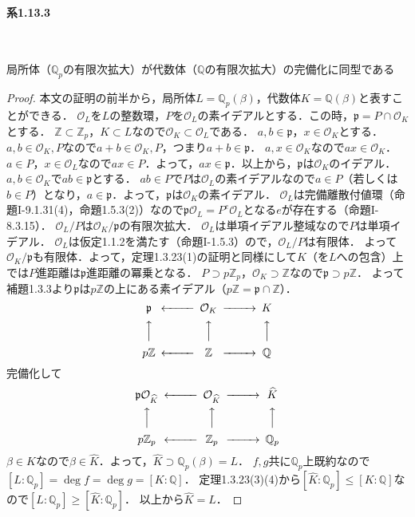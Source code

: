 \paragraph{系1.13.3}~
\begin{screen}
  局所体（$\mathbb{Q}_p$の有限次拡大）が代数体（$\mathbb{Q}$の有限次拡大）の完備化に同型である
\end{screen}
\begin{proof}
  本文の証明の前半から，局所体$L=\mathbb{Q}_p(\beta)$，代数体$K=\mathbb{Q}(\beta)$と表すことができる．
  $\mathcal{O}_L$を$L$の整数環，$P$を$\mathcal{O}_L$の素イデアルとする．この時，$\mathfrak{p}=P\cap\mathcal{O}_K$とする．
  $\mathbb{Z} \subset \mathbb{Z}_p$，$K \subset L$なので$\mathcal{O}_K \subset \mathcal{O}_L$である．
  $a,b\in\mathfrak{p}$，$x\in\mathcal{O}_K$とする．
  $a,b\in\mathcal{O}_K,P$なので$a+b\in\mathcal{O}_K,P$，つまり$a+b\in\mathfrak{p}$．
  $a,x\in\mathcal{O}_K$なので$ax\in\mathcal{O}_K$．
  $a\in P$，$x\in\mathcal{O}_L$なので$ax\in P$．よって，$ax\in\mathfrak{p}$．以上から，$\mathfrak{p}$は$\mathcal{O}_K$のイデアル．
  $a,b\in\mathcal{O}_K$で$ab\in \mathfrak{p}$とする．
  $ab\in P$で$P$は$\mathcal{O}_L$の素イデアルなので$a\in P$（若しくは$b\in P$）となり，$a\in\mathfrak{p}$．よって，$\mathfrak{p}$は$\mathcal{O}_K$の素イデアル．
  $\mathcal{O}_L$は完備離散付値環（命題I-9.1.31(4)，命題1.5.3(2)）なので$\mathfrak{p}\mathcal{O}_L=P^e\mathcal{O}_L$となる$e$が存在する（命題I-8.3.15）．
  $\mathcal{O}_L/P$は$\mathcal{O}_K/\mathfrak{p}$の有限次拡大．
  $\mathcal{O}_L$は単項イデアル整域なので$P$は単項イデアル．
  $\mathcal{O}_L$は仮定1.1.2を満たす（命題I-1.5.3）ので，$\mathcal{O}_L/P$は有限体．
  よって$\mathcal{O}_K/\mathfrak{p}$も有限体．よって，定理1.3.23(1)の証明と同様にして$K$（を$L$への包含）上では$P$進距離は$\mathfrak{p}$進距離の冪乗となる．
  $P\supset p\mathbb{Z}_p$，$\mathcal{O}_K\supset\mathbb{Z}$なので$\mathfrak{p}\supset p\mathbb{Z}$．
  よって補題1.3.3より$\mathfrak{p}$は$p\mathbb{Z}$の上にある素イデアル（$p\mathbb{Z}=\mathfrak{p}\cap\mathbb{Z}$）．
  \[
  \begin{CD}
    \mathfrak{p} @<<< \mathcal{O}_K @>>> K \\
    @AAA         @AAA               @AAA \\
    p\mathbb{Z}  @<<< \mathbb{Z}    @>>> \mathbb{Q}
  \end{CD}
  \]
  完備化して
  \[
  \begin{CD}
    \mathfrak{p}\mathcal{O}_{\widehat{K}}   @<<< \mathcal{O}_{\widehat{K}} @>>> \widehat{K}\\
    @AAA                              @AAA                     @AAA \\
    p\mathbb{Z}_p                     @<<< \mathbb{Z}_p        @>>> \mathbb{Q}_p
  \end{CD}
  \]
  $\beta\in K$なので$\beta\in\widehat{K}$．よって，$\widehat{K}\supset\mathbb{Q}_p(\beta)=L$．
  $f,g$共に$\mathbb{Q}_p$上既約なので$[L:\mathbb{Q}_p]=\deg f=\deg g=[K:\mathbb{Q}]$．
  定理1.3.23(3)(4)から$[\widehat{K}:\mathbb{Q}_p]\leq[K:\mathbb{Q}]$なので$[L:\mathbb{Q}_p]\geq[\widehat{K}:\mathbb{Q}_p]$．
  以上から$\widehat{K}=L$．
\end{proof}

